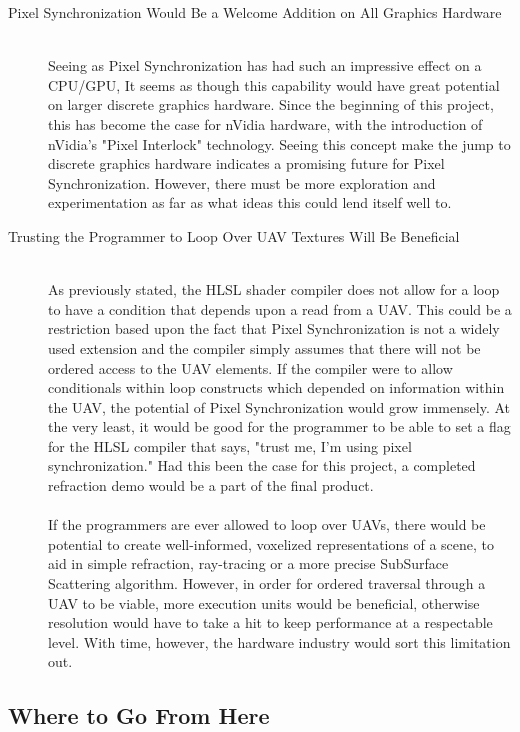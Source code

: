 \documentclass[a4paper, 12pt]{article}
\begin{document}
\begin{description}
\item[Pixel Synchronization Would Be a Welcome Addition on All Graphics Hardware] \hfill \\

Seeing as Pixel Synchronization has had such an impressive effect on a
CPU/GPU, It seems as though this capability would have great potential on
larger discrete graphics hardware. Since the beginning of this project, this
has become the case for nVidia hardware, with the introduction of nVidia's
"Pixel Interlock" technology. Seeing this concept make the jump to discrete
graphics hardware indicates a promising future for Pixel Synchronization.
However, there must be more exploration and experimentation as far as what
ideas this could lend itself well to.

\item[Trusting the Programmer to Loop Over UAV Textures Will Be Beneficial]
\hfill \\

As previously stated, the HLSL shader compiler does not allow for a loop to
have a condition that depends upon a read from a UAV. This could be a
restriction based upon the fact that Pixel Synchronization is not a widely
used extension and the compiler simply assumes that there will not be ordered
access to the UAV elements. If the compiler were to allow conditionals within
loop constructs which depended on information within the UAV, the potential of
Pixel Synchronization would grow immensely. At the very least, it would be
good for the programmer to be able to set a flag for the HLSL compiler that
says, "trust me, I'm using pixel synchronization." Had this been the case for
this project, a completed refraction demo would be a part of the final
product. \\ \\ If the programmers are ever allowed to loop over UAVs, there
would be potential to create well-informed, voxelized representations of a
scene, to aid in simple refraction, ray-tracing or a more precise SubSurface
Scattering algorithm. However, in order for ordered traversal through a UAV to
be viable, more execution units would be beneficial, otherwise resolution
would have to take a hit to keep performance at a respectable level. With
time, however, the hardware industry would sort this limitation out.

\end{description}

\subsection{Where to Go From Here}
\end{document}
